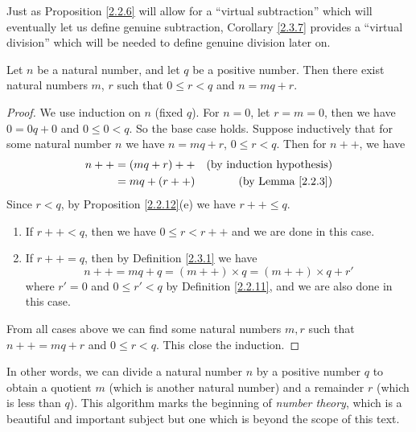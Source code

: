 \begin{remark}\label{2.3.8}
    Just as Proposition \ref{2.2.6} will allow for a ``virtual subtraction'' which will eventually let us define genuine subtraction, Corollary \ref{2.3.7} provides a ``virtual division'' which will be needed to define genuine division later on.
\end{remark}

\begin{proposition}\label{2.3.9}
    Let \(n\) be a natural number, and let \(q\) be a positive number.
    Then there exist natural numbers \(m\), \(r\) such that \(0 \leq r < q\) and \(n = mq + r\).
\end{proposition}

\begin{proof}
    We use induction on \(n\) (fixed \(q\)).
    For \(n = 0\), let \(r = m = 0\), then we have \(0 = 0q + 0\) and \(0 \leq 0 < q\).
    So the base case holds.
    Suppose inductively that for some natural number \(n\) we have \(n = mq + r\), \(0 \leq r < q\).
    Then for \(n++\), we have
    \begin{align*}
        n++ & = (mq + r)++ & \text{(by induction hypothesis)} \\
            & = mq + (r++) & \text{(by Lemma \ref{2.2.3})}    \\
    \end{align*}
    Since \(r < q\), by Proposition \ref{2.2.12}(e) we have \(r++ \leq q\).
    \begin{enumerate}
        \item If \(r++ < q\), then we have \(0 \leq r < r++\) and we are done in this case.
        \item If \(r++ = q\), then by Definition \ref{2.3.1} we have
              \[
                  n++ = mq + q = (m++) \times q = (m++) \times q + r'
              \]
              where \(r' = 0\) and \(0 \leq r' < q\) by Definition \ref{2.2.11}, and we are also done in this case.
    \end{enumerate}
    From all cases above we can find some natural numbers \(m, r\) such that \(n++ = mq + r\) and \(0 \leq r < q\).
    This close the induction.
\end{proof}

\begin{remark}\label{2.3.10}
    In other words, we can divide a natural number \(n\) by a positive number \(q\) to obtain a quotient \(m\) (which is another natural number) and a remainder \(r\) (which is less than \(q\)).
    This algorithm marks the beginning of \emph{number theory}, which is a beautiful and important subject but one which is beyond the scope of this text.
\end{remark}

